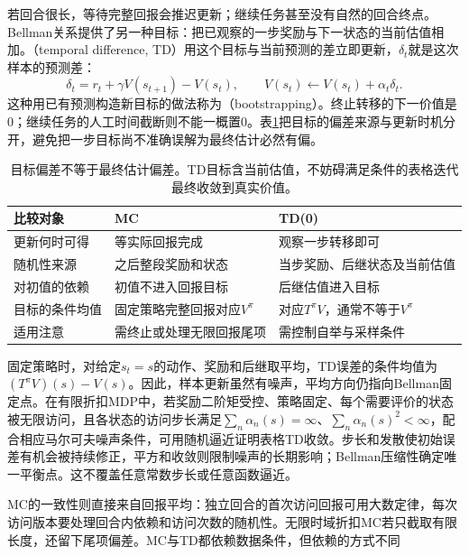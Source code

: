 若回合很长，等待完整回报会推迟更新；继续任务甚至没有自然的回合终点。Bellman关系提供了另一种目标：把已观察的一步奖励与下一状态的当前估值相加。（temporal difference, TD）用这个目标与当前预测的差立即更新，$\delta_t$就是这次样本的预测差：
\begin{equation}
  \delta_t=r_t+\gamma V(s_{t+1})-V(s_t),\qquad
  V(s_t)\leftarrow V(s_t)+\alpha_t\delta_t .
  \label{eq:rl-learning-td-zero}
\end{equation}
这种用已有预测构造新目标的做法称为（bootstrapping）。终止转移的下一价值是0；继续任务的人工时间截断则不能一概置0。表\ref{tab:rl-learning-mc-td}把目标的偏差来源与更新时机分开，避免把一步目标尚不准确误解为最终估计必然有偏。

\begin{table}[htbp]
  \centering
  \small
  \begin{tabularx}{\linewidth}{>{\raggedright\arraybackslash}p{22mm} >{\raggedright\arraybackslash}X >{\raggedright\arraybackslash}X}
    \toprule
    比较对象 & MC & TD(0) \\
    \midrule
    更新何时可得 & 等实际回报完成 & 观察一步转移即可 \\
    随机性来源 & 之后整段奖励和状态 & 当步奖励、后继状态及当前估值 \\
    对初值的依赖 & 初值不进入回报目标 & 后继估值进入目标 \\
    目标的条件均值 & 固定策略完整回报对应$V^\pi$ & 对应$T^\pi V$，通常不等于$V^\pi$ \\
    适用注意 & 需终止或处理无限回报尾项 & 需控制自举与采样条件 \\
    \bottomrule
  \end{tabularx}
  \caption{目标偏差不等于最终估计偏差。TD目标含当前估值，不妨碍满足条件的表格迭代最终收敛到真实价值。}
  \label{tab:rl-learning-mc-td}
\end{table}

固定策略时，对给定$s_t=s$的动作、奖励和后继取平均，TD误差的条件均值为$(T^\pi V)(s)-V(s)$。因此，样本更新虽然有噪声，平均方向仍指向Bellman固定点。在有限折扣MDP中，若奖励二阶矩受控、策略固定、每个需要评价的状态被无限访问，且各状态的访问步长满足$\sum_n\alpha_n(s)=\infty$、$\sum_n\alpha_n(s)^2<\infty$，配合相应马尔可夫噪声条件，可用随机逼近证明表格TD收敛。步长和发散使初始误差有机会被持续修正，平方和收敛则限制噪声的长期影响；Bellman压缩性确定唯一平衡点。这不覆盖任意常数步长或任意函数逼近。

MC的一致性则直接来自回报平均：独立回合的首次访问回报可用大数定律，每次访问版本要处理回合内依赖和访问次数的随机性。无限时域折扣MC若只截取有限长度，还留下尾项偏差。MC与TD都依赖数据条件，但依赖的方式不同

